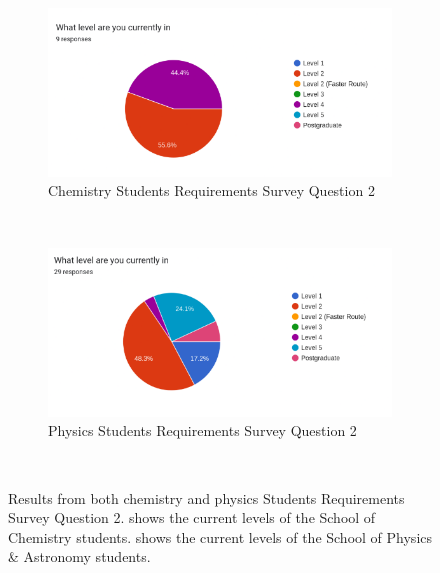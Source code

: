 \documentclass{l4proj}
\begin{document}
\begin{figure}[h]
    \centering
    \begin{subfigure}[b]{0.6\textwidth}
        \includegraphics[width=\textwidth]{images/levelsChem.pdf}
        \caption{Chemistry Students Requirements Survey Question 2}
        \label{fig:syn1}
    \end{subfigure}
    ~ %
    \begin{subfigure}[b]{0.6\textwidth}
        \includegraphics[width=\textwidth]{images/levelsPhys.pdf}
        \caption{Physics Students Requirements Survey Question 2}
        \label{fig:syn2}
    \end{subfigure}
    ~ %
    \caption{Results from both chemistry and physics Students Requirements Survey Question 2.  shows the current levels of the School of Chemistry students.  shows the current levels of the School of Physics \& Astronomy students.
    }\label{fig:levels}
\end{figure}
\end{document}

